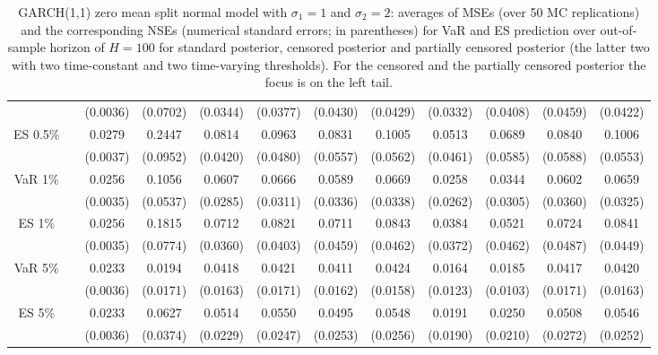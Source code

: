 {{\begin{sidewaystable}
\begin{tabular}{cc cc | cccc | cccc}
  && (0.0036) & (0.0702) & (0.0344) & (0.0377) & (0.0430) & (0.0429) &(0.0332) & (0.0408) & (0.0459) & (0.0422) \\ 
\rowcolor{LightCyan} 
ES 0.5\% && 0.0279 & 0.2447 & 0.0814 & 0.0963 & 0.0831 & 0.1005 &0.0513 & 0.0689 & 0.0840 & 0.1006 \\ 
  && (0.0037) & (0.0952) & (0.0420) & (0.0480) & (0.0557) & (0.0562) &(0.0461) & (0.0585) & (0.0588) & (0.0553) \\ [1ex] 
\rowcolor{LightCyan} 
VaR 1\% && 0.0256 & 0.1056 & 0.0607 & 0.0666 & 0.0589 & 0.0669 &0.0258 & 0.0344 & 0.0602 & 0.0659 \\   
 && (0.0035) & (0.0537) & (0.0285) & (0.0311) & (0.0336) & (0.0338) &(0.0262) & (0.0305) & (0.0360) & (0.0325) \\  
\rowcolor{LightCyan} 
ES 1\% && 0.0256 & 0.1815 & 0.0712 & 0.0821 & 0.0711 & 0.0843 &0.0384 & 0.0521 & 0.0724 & 0.0841 \\ 
  && (0.0035) & (0.0774) & (0.0360) & (0.0403) & (0.0459) & (0.0462) &(0.0372) & (0.0462) & (0.0487) & (0.0449) \\ [1ex]
\rowcolor{LightCyan} 
VaR 5\% && 0.0233 & 0.0194 & 0.0418 & 0.0421 & 0.0411 & 0.0424 &0.0164 & 0.0185 & 0.0417 & 0.0420 \\ 
  && (0.0036) & (0.0171) & (0.0163) & (0.0171) & (0.0162) & (0.0158) &(0.0123) & (0.0103) & (0.0171) & (0.0163) \\ 
\rowcolor{LightCyan} 
ES 5\% && 0.0233 & 0.0627 & 0.0514 & 0.0550 & 0.0495 & 0.0548 &0.0191 & 0.0250 & 0.0508 & 0.0546 \\ 
 && (0.0036) & (0.0374) & (0.0229) & (0.0247) & (0.0253) & (0.0256) &(0.0190) & (0.0210) & (0.0272) & (0.0252) \\ 
\hline 
\end{tabular}
 \caption{GARCH(1,1) zero mean split normal model with $\sigma_{1} = 1$ and $\sigma_{2} = 2$:  averages of MSEs (over 50 MC replications) and the corresponding NSEs (numerical standard errors; in parentheses)  for VaR and ES prediction over out-of-sample horizon of $H=100$  for standard posterior, censored posterior and partially censored posterior (the latter two with two time-constant and two time-varying thresholds).  For the censored and the partially censored posterior the focus is on the left tail.} 
\label{tab:garch11_pcp_var}  
\end{sidewaystable}
}
}